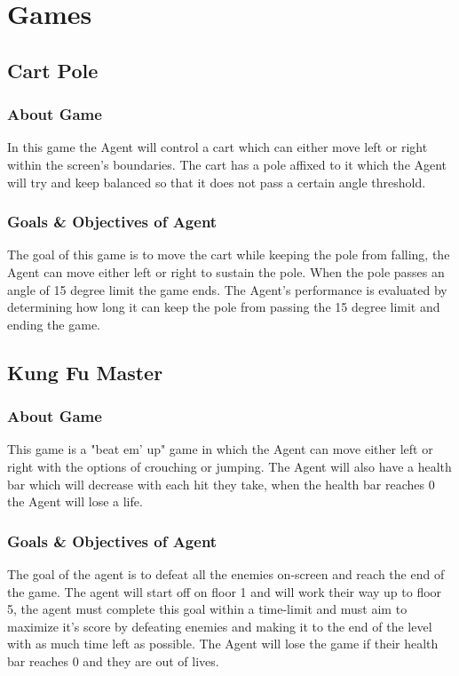 \documentclass[conference]{IEEEtran}
\begin{document}
\section{Games}
\subsection{Cart Pole}
\subsubsection{About Game}
In this game the Agent will control a cart which can either move left or right within the screen's boundaries.  The cart has a pole affixed to it which the Agent will try and keep balanced so that it does not pass a certain angle threshold.
\subsubsection{Goals \& Objectives of Agent}
The goal of this game is to move the cart while keeping the pole from falling, the Agent can move either left or right to sustain the pole.  When the pole passes an angle of 15 degree limit the game ends.  The Agent's performance is evaluated by determining how long it can keep the pole from passing the 15 degree limit and ending the game.
\subsection{Kung Fu Master}
\subsubsection{About Game}
This game is a "beat em' up" game in which the Agent can move either left or right with the options of crouching or jumping.  The Agent will also have a health bar which will decrease with each hit they take, when the health bar reaches 0 the Agent will lose a life.  
\subsubsection{Goals \& Objectives of Agent}
The goal of the agent is to defeat all the enemies on-screen and reach the end of the game.  The agent will start off on floor 1 and will work their way up to floor 5, the agent must complete this goal within a time-limit and must aim to maximize it's score by defeating enemies and making it to the end of the level with as much time left as possible.  The Agent will lose the game if their health bar reaches 0 and they are out of lives.
\end{document}
